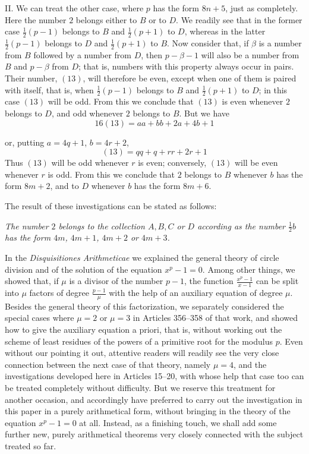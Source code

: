 II. We can treat the other case, where $p$ has the form $8n+5$, just as completely. Here the number $2$ belongs either to $B$ or to $D$. We readily see that in the former case $\frac12(p-1)$ belongs to $B$ and $\frac12(p+1)$ to $D$, whereas in the latter $\frac12(p-1)$ belongs to $D$ and $\frac12(p+1)$ to $B$. Now consider that, if $\beta$ is a number from $B$ followed by a number from $D$, then $p-\beta-1$ will also be a number from $B$ and $p-\beta$ from $D$; that is, numbers with this property always occur in pairs. Their number, $(13)$, will therefore be even, except when one of them is paired with itself, that is, when $\frac12(p-1)$ belongs to $B$ and $\frac12(p+1)$ to $D$; in this case $(13)$ will be odd. From this we conclude that $(13)$ is even whenever $2$ belongs to $D$, and odd whenever $2$ belongs to $B$. But we have
\[
16(13)=aa+bb+2a+4b+1
\]

%
or, putting $a=4q+1$, $b=4r+2$,
\[
(13)=qq+q+rr+2r+1
\]
Thus $(13)$ will be odd whenever $r$ is even; conversely, $(13)$ will be even whenever $r$ is odd. From this we conclude that $2$ belongs to $B$ whenever $b$ has the form $8m+2$, and to $D$ whenever $b$ has the form $8m+6$.

The result of these investigations can be stated as follows:

\emph{The number $2$ belongs to the collection $A,B,C$ or $D$ according as the number $\frac12b$ has the form $4m$, $4m+1$, $4m+2$ or $4m+3$.}

In the \emph{Disquisitiones Arithmeticae} we explained the general theory of circle division and of the solution of the equation $x^p-1=0$. Among other things, we showed that, if $\mu$ is a divisor of the number $p-1$, the function $\frac{x^p-1}{x-1}$ can be split into $\mu$ factors of degree $\frac{p-1}{\mu}$ with the help of an auxiliary equation of degree $\mu$. Besides the general theory of this factorization, we separately considered the special cases where $\mu=2$ or $\mu=3$ in Articles 356--358 of that work, and showed how to give the auxiliary equation a priori, that is, without working out the scheme of least residues of the powers of a primitive root for the modulus $p$. Even without our pointing it out, attentive readers will readily see the very close connection between the next case of that theory, namely $\mu=4$, and the investigations developed here in Articles 15--20, with whose help that case too can be treated completely without difficulty. But we reserve this treatment for another occasion, and accordingly have preferred to carry out the investigation in this paper in a purely arithmetical form, without bringing in the theory of the equation $x^p-1=0$ at all. Instead, as a finishing touch, we shall add some further new, purely arithmetical theorems very closely connected with the subject treated so far.
